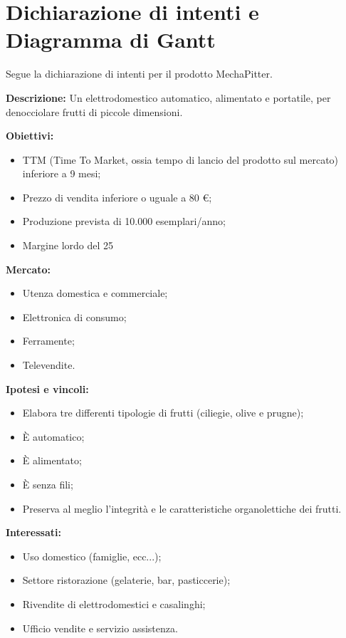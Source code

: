 \documentclass[12pt,a4paper,twoside]{report}  %
\begin{document}
\section{Dichiarazione di intenti e Diagramma di Gantt}
Segue la dichiarazione di intenti per il prodotto MechaPitter.

\textbf{Descrizione:} Un elettrodomestico automatico, alimentato e portatile, per denocciolare frutti di piccole dimensioni.

\textbf{Obiettivi:}
\begin{itemize}
\item TTM (Time To Market, ossia tempo di lancio del prodotto sul mercato) inferiore a 9 mesi;
\item Prezzo di vendita inferiore o uguale a 80 €;
\item Produzione prevista di 10.000 esemplari/anno;
\item Margine lordo del 25%
\end{itemize}

\textbf{Mercato:}
\begin{itemize}
\item Utenza domestica e commerciale;
\item Elettronica di consumo;
\item Ferramente;
\item Televendite.
\end{itemize}

\textbf{Ipotesi e vincoli:}
\begin{itemize}
\item Elabora tre differenti tipologie di frutti (ciliegie, olive e prugne);
\item È automatico;
\item È alimentato;
\item È senza fili;
\item Preserva al meglio l'integrità e le caratteristiche organolettiche dei frutti.
\end{itemize}

\textbf{Interessati:}
\begin{itemize}
\item Uso domestico (famiglie, ecc...);
\item Settore ristorazione (gelaterie, bar, pasticcerie);
\item Rivendite di elettrodomestici e casalinghi;
\item Ufficio vendite e servizio assistenza.
\end{itemize}
\end{document}
